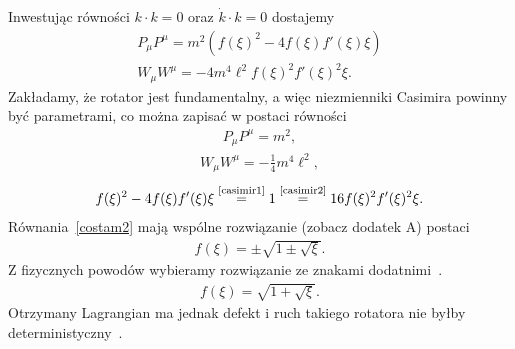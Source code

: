 Inwestując równości $k\cdot k=0$ 
oraz $\dot{k} \cdot k= 0$ dostajemy
\begin{align*}
P_\mu P^\mu =  m^2( f(\xi)^2- 4 f(\xi) f'(\xi) \xi) \\
W_\mu W^\mu = 
 - 4 m^4\ell^2  f(\xi)^2 f'(\xi)^2 \xi .
\end{align*}
Zakładamy, że rotator jest fundamentalny, a więc niezmienniki
Casimira powinny być parametrami, co można zapisać w postaci
równości
\begin{align} \label{casimir1}
P_\mu P^\mu = m^2, \tag{C1}
\end{align}
\begin{align} \label{casimir2}
W_\mu W^\mu = - \frac{1}{4} m^4 \ell^2 , \tag{C2}
\end{align}
\begin{align}\label{costam2} 
 f(\xi)^2- 4 f(\xi) f'(\xi) \xi
\stackrel{\text{\ref{casimir1}}}{=} 
1 \stackrel{\text{\ref{casimir2}}}{=}
  16   f(\xi)^2 f'(\xi)^2 \xi .
\end{align}
Równania~\eqref{costam2} mają wspólne rozwiązanie (zobacz dodatek A)
postaci 
\begin{align*}
f(\xi ) = \pm \sqrt{ 1 \pm \sqrt{\xi} }.
\end{align*}
Z fizycznych powodów wybieramy rozwiązanie ze znakami
dodatnimi~\cite{Bratek2009nonuniq}.
\begin{align*}
f(\xi ) =  \sqrt{ 1 + \sqrt{\xi} }.
\end{align*}
Otrzymany Lagrangian ma jednak defekt i ruch takiego 
rotatora nie byłby deterministyczny~\cite{Bratek2012Spinorindeterm}.


